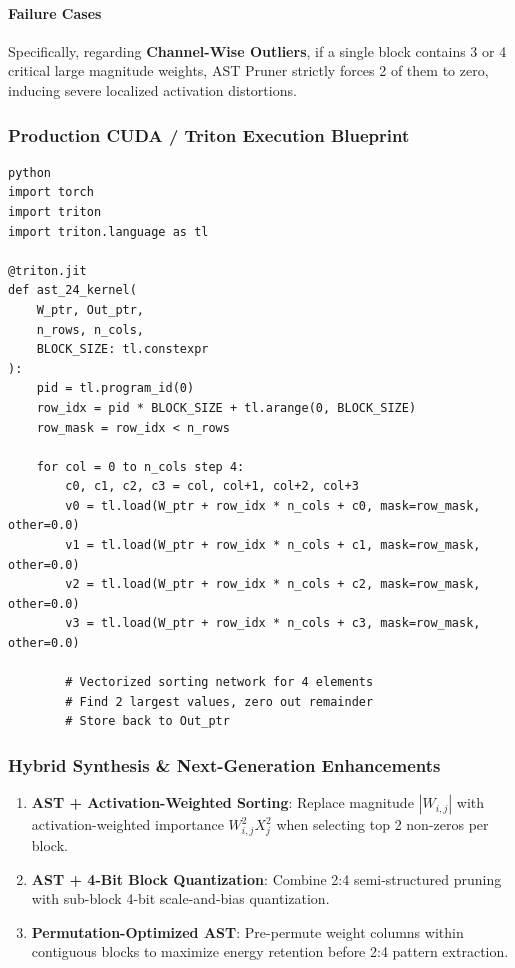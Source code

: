 \paragraph{Failure Cases}

Specifically, regarding \textbf{Channel-Wise Outliers}, if a single block contains 3 or 4 critical large magnitude weights, AST Pruner strictly forces 2 of them to zero, inducing severe localized activation distortions.



\subsubsection*{Production CUDA / Triton Execution Blueprint}

\vspace{0.5em}
\begin{mdframed}[backgroundcolor=codebg, linecolor=codeframe, linewidth=1pt, roundcorner=4pt, innerleftmargin=2pt, innerrightmargin=5pt, innertopmargin=5pt, innerbottommargin=5pt]
\begin{lstlisting}
python
import torch
import triton
import triton.language as tl

@triton.jit
def ast_24_kernel(
    W_ptr, Out_ptr,
    n_rows, n_cols,
    BLOCK_SIZE: tl.constexpr
):
    pid = tl.program_id(0)
    row_idx = pid * BLOCK_SIZE + tl.arange(0, BLOCK_SIZE)
    row_mask = row_idx < n_rows

    for col = 0 to n_cols step 4:
        c0, c1, c2, c3 = col, col+1, col+2, col+3
        v0 = tl.load(W_ptr + row_idx * n_cols + c0, mask=row_mask, other=0.0)
        v1 = tl.load(W_ptr + row_idx * n_cols + c1, mask=row_mask, other=0.0)
        v2 = tl.load(W_ptr + row_idx * n_cols + c2, mask=row_mask, other=0.0)
        v3 = tl.load(W_ptr + row_idx * n_cols + c3, mask=row_mask, other=0.0)

        # Vectorized sorting network for 4 elements
        # Find 2 largest values, zero out remainder
        # Store back to Out_ptr
\end{lstlisting}
\end{mdframed}
\vspace{0.5em}


\subsubsection*{Hybrid Synthesis \& Next-Generation Enhancements}

\begin{enumerate}
\item \textbf{AST + Activation-Weighted Sorting}: Replace magnitude $|W_{i,j}|$ with activation-weighted importance $W_{i,j}^2 X_j^2$ when selecting top 2 non-zeros per block.
\item \textbf{AST + 4-Bit Block Quantization}: Combine 2:4 semi-structured pruning with sub-block 4-bit scale-and-bias quantization.
\item \textbf{Permutation-Optimized AST}: Pre-permute weight columns within contiguous blocks to maximize energy retention before 2:4 pattern extraction.

\end{enumerate}
